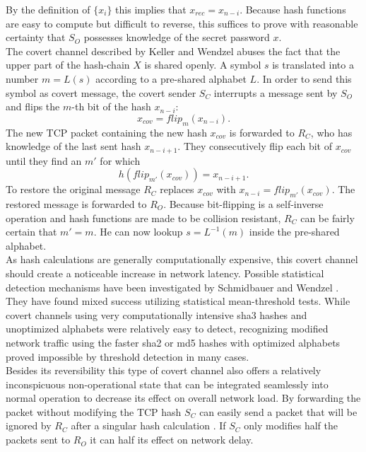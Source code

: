 \documentclass[12pt,a4paper,automark, toc=bib]{scrreprt}
\theoremstyle{definition}
\begin{document}
			By the definition of $\{x_i\}$ this implies that $x_{rec} = x_{n-i}$. Because hash functions are easy to compute but difficult to reverse, this suffices to prove with reasonable certainty that $S_O$ possesses knowledge of the secret password $x$.\\
			The covert channel described by Keller and Wendzel abuses the fact that the upper part of the hash-chain $X$ is shared openly. A symbol $s$ is translated into a number $m = L(s)$ according to a pre-shared alphabet $L$. In order to send this symbol as covert message, the covert sender $S_C$ interrupts a message sent by $S_O$ and flips the $m$-th bit of the hash $x_{n-i}$:
			\begin{equation}
				x_{cov} = flip_m(x_{n-i}).
			\end{equation}
			 The new TCP packet containing the new hash $x_{cov}$ is forwarded to $R_C$, who has knowledge of the last sent hash $x_{n-i+1}$. They consecutively flip each bit of $x_{cov}$ until they find an $m'$ for which 
			 \begin{equation}
			 	h({flip}_{m'}(x_{cov})) = x_{n-i+1}.
			 	\label{cc-equ}
			 \end{equation}
			 To restore the original message $R_C$ replaces $x_{cov}$ with $x_{n-i} = {flip}_{m'}(x_{cov})$. The restored message is forwarded to $R_O$. Because bit-flipping is a self-inverse operation and hash functions are made to be collision resistant, $R_C$ can be fairly certain that $m' = m$. He can now lookup $s = L^{-1}(m)$ inside the pre-shared alphabet. \\
			As hash calculations are generally computationally expensive, this covert channel should create a noticeable increase in network latency. Possible statistical detection mechanisms have been investigated by Schmidbauer and Wendzel \cite{Schmidbauer2021}. They have found mixed success utilizing statistical mean-threshold tests. While covert channels using very computationally intensive sha3 hashes and unoptimized alphabets were relatively easy to detect, recognizing modified network traffic using the faster sha2 or md5 hashes with optimized alphabets proved impossible by threshold detection in many cases. \\
			Besides its reversibility this type of covert channel also offers a relatively inconspicuous non-operational state that can be integrated seamlessly into normal operation to decrease its effect on overall network load. By forwarding the packet without modifying the TCP hash $S_C$ can easily send a packet that will be ignored by $R_C$ after a singular hash calculation  \cite{Schmidbauer}. If $S_C$ only modifies half the packets sent to $R_O$ it can half its effect on network delay. \\
\end{document}
